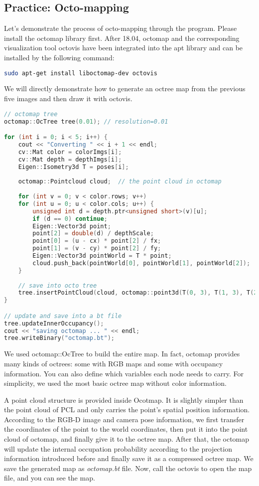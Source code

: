 \subsection{Practice: Octo-mapping}
Let's demonstrate the process of octo-mapping through the program. Please install the octomap library first. After 18.04, octomap and the corresponding visualization tool octovis have been integrated into the apt library and can be installed by the following command:
\begin{lstlisting}[language=sh,caption=Terminal input:]
sudo apt-get install liboctomap-dev octovis
\end{lstlisting}
We will directly demonstrate how to generate an octree map from the previous five images and then draw it with octovis.
\begin{lstlisting}[language=c++,caption=slambook/ch13/dense\_RGBD/octomap\_mapping.cpp (part)]
// octomap tree 
octomap::OcTree tree(0.01); // resolution=0.01

for (int i = 0; i < 5; i++) {
	cout << "Converting " << i + 1 << endl;
	cv::Mat color = colorImgs[i];
	cv::Mat depth = depthImgs[i];
	Eigen::Isometry3d T = poses[i];
	
	octomap::Pointcloud cloud;  // the point cloud in octomap 
	
	for (int v = 0; v < color.rows; v++)
	for (int u = 0; u < color.cols; u++) {
		unsigned int d = depth.ptr<unsigned short>(v)[u]; 
		if (d == 0) continue; 
		Eigen::Vector3d point;
		point[2] = double(d) / depthScale;
		point[0] = (u - cx) * point[2] / fx;
		point[1] = (v - cy) * point[2] / fy;
		Eigen::Vector3d pointWorld = T * point;
		cloud.push_back(pointWorld[0], pointWorld[1], pointWorld[2]);
	}
	
	// save into octo tree
	tree.insertPointCloud(cloud, octomap::point3d(T(0, 3), T(1, 3), T(2, 3)));
}

// update and save into a bt file
tree.updateInnerOccupancy();
cout << "saving octomap ... " << endl;
tree.writeBinary("octomap.bt");
\end{lstlisting}

We used octomap::OcTree to build the entire map. In fact, octomap provides many kinds of octrees: some with RGB maps and some with occupancy information. You can also define which variables each node needs to carry. For simplicity, we used the most basic octree map without color information.

A point cloud structure is provided inside Ocotmap. It is slightly simpler than the point cloud of PCL and only carries the point's spatial position information. According to the RGB-D image and camera pose information, we first transfer the coordinates of the point to the world coordinates, then put it into the point cloud of octomap, and finally give it to the octree map. After that, the octomap will update the internal occupation probability according to the projection information introduced before and finally save it as a compressed octree map. We save the generated map as \textit{octomap.bt} file. Now, call the octovis to open the map file, and you can see the map.

